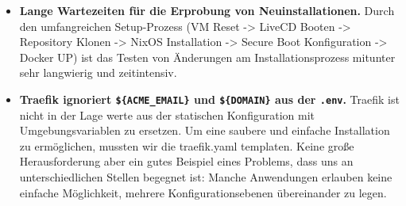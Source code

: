 \begin{itemize}
    behoben in \href{https://github.com/NixOS/nixpkgs/pull/535329}{nixpkgs PR \#535329}
    ("nixos/apparmor: fix lsm loading order"). Das eigentliche Kernproblem: Der
    upstream Fix war erst kurz vor Abgabe verfügbar.
  \item \textbf{Lange Wartezeiten für die Erprobung von Neuinstallationen.} Durch den umfangreichen Setup-Prozess (VM Reset -> LiveCD Booten -> Repository Klonen -> NixOS Installation -> Secure Boot Konfiguration -> Docker UP) ist das Testen von Änderungen am Installationsprozess mitunter sehr langwierig und zeitintensiv.
  \item \textbf{Traefik ignoriert \texttt{\$\{ACME\_EMAIL\}} und \texttt{\$\{DOMAIN\}}
    aus der \texttt{.env}.} Traefik ist nicht in der Lage werte aus der statischen Konfiguration mit Umgebungsvariablen zu ersetzen. Um eine saubere und einfache Installation zu ermöglichen, mussten wir die traefik.yaml templaten. Keine große Herausforderung aber ein gutes Beispiel eines Problems, dass uns an unterschiedlichen Stellen begegnet ist: Manche Anwendungen erlauben keine einfache Möglichkeit, mehrere Konfigurationsebenen übereinander zu legen.
\end{itemize}
